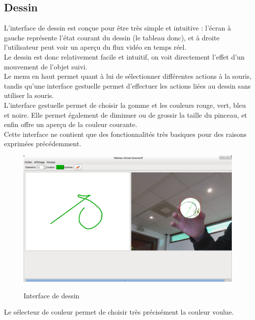 \documentclass{report}
\begin{document}
			\subsection{Dessin}
			L'interface de dessin est conçue pour être très simple et intuitive : l'écran à gauche représente l'état courant du dessin (le tableau donc), et à droite l'utilisateur peut voir un aperçu du flux vidéo en temps réel. \\
			Le dessin est donc relativement facile et intuitif, on voit directement l'effet d'un mouvement de l'objet suivi. \\
			Le menu en haut permet quant à lui de sélectionner différentes actions à la souris, tandis qu'une interface gestuelle permet d'effectuer les actions liées au dessin sans utiliser la souris. \\
			L'interface gestuelle permet de choisir la gomme et les couleurs rouge, vert, bleu et noire. Elle permet également de diminuer ou de grossir la taille du pinceau, et enfin offre un aperçu de la couleur courante. \\
			Cette interface ne contient que des fonctionnalités très basiques pour des raisons exprimées précédemment. \\
				\begin{figure}[!h]
						\centering
						\includegraphics[scale=0.4]{capture.png}\\
						\caption{Interface de dessin}
						\label{Interface de dessin}
				\end{figure}
				\newpage
				Le sélecteur de couleur permet de choisir très précisément la couleur voulue. \\
\end{document}
